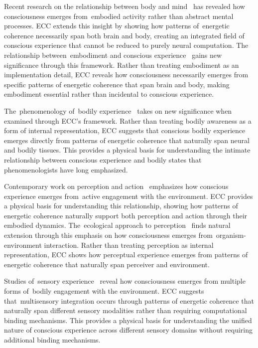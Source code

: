Recent research on the relationship between body and mind~\cite{Gallagher2005, damasio2006descartes} has revealed how consciousness emerges from~embodied activity rather than abstract mental processes. ECC extends this insight by showing how patterns of~energetic coherence necessarily span both brain and body, creating an integrated field of conscious experience that cannot be reduced to purely neural computation. The relationship between~embodiment and conscious experience~\cite{Jackson1989, nagel1980like} gains new significance through this framework. Rather than treating embodiment as an implementation detail, ECC reveals how consciousness necessarily emerges from specific patterns of energetic coherence that span brain and body, making embodiment essential rather than incidental to conscious experience.

The~phenomenology of~bodily experience~\cite{Leder1990, gallagher2020phenomenological} takes on new significance when examined through ECC's framework. Rather than treating bodily awareness as a form of internal representation, ECC suggests that conscious bodily experience emerges directly from patterns of energetic coherence that naturally span neural and bodily tissues. This provides a physical basis for understanding the intimate relationship between conscious experience and bodily states that phenomenologists have long emphasized.

Contemporary work on perception and action~\cite{Noe2004, Clark2016} emphasizes how conscious experience emerges from~active engagement with the environment. ECC provides a physical basis for understanding this relationship, showing how patterns of energetic coherence naturally support both perception and action through their embodied dynamics. The~ecological approach to perception~\cite{Gibson1979, clark1998being} finds natural extension through this emphasis on how consciousness emerges from~organism-environment interaction. Rather than treating perception as internal representation, ECC shows how perceptual experience emerges from patterns of energetic coherence that naturally span perceiver and environment.

Studies of~sensory experience~\cite{Howes2003, Noe2004} reveal how consciousness emerges from multiple forms of~bodily engagement with the environment. ECC suggests that~multisensory integration occurs through patterns of energetic coherence that naturally span different sensory modalities rather than requiring computational binding mechanisms. This provides a physical basis for understanding the unified nature of conscious experience across different sensory domains without requiring additional binding mechanisms.

